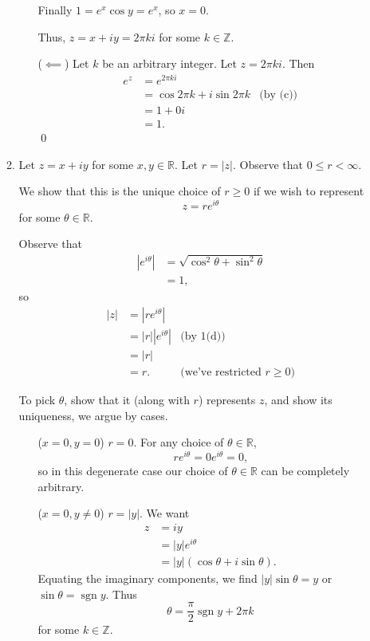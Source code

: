 \documentclass[oneside]{article}
\newcommand\abs[1]{\left|#1\right|}
\DeclareMathOperator{\sgn}{sgn}
\newcommand\bbR{\mathbb{R}}
\newcommand\bbZ{\mathbb{Z}}
\begin{document}
\begin{enumerate}[label=\textbf{\arabic*.}]
\begin{enumerate}[label=\textbf{(\alph*)}]
\begin{itemize}[leftmargin=34pt]
        Finally $1 = e^x \cos y = e^x$, so $x = 0$.

        Thus, $z = x + iy = 2\pi k i$ for some $k \in \bbZ$.

      \item[($\impliedby$)] Let $k$ be an arbitrary integer. Let $z = 2\pi k i$.
      Then\begin{align*}
        e^z &= e^{2\pi k i} \\
        &= \cos 2\pi k + i\sin 2\pi k &\text{(by (c))} \\
        &= 1 + 0i \\
        &= 1 \text{.}
      \end{align*}\qed
      \end{itemize}

    \item Let $z = x + iy$ for some $x, y \in \bbR$. Let $r = \abs{z}$.
      Observe that $0 \leq r < \infty$.

      We show that this is the unique choice of $r \geq 0$ if we wish to
      represent\[
        z = re^{i\theta}
      \] for some $\theta \in \bbR$.

      Observe that \begin{align*}
        \abs{e^{i\theta}}
        &= \sqrt{\cos^2\theta + \sin^2\theta} \\
        &= 1\text{,}
      \end{align*} so\begin{align*}
        \abs{z} &= \abs{re^{i\theta}} \\
        &= \abs{r}\abs{e^{i\theta}} &\text{(by 1(d))} \\
        &= \abs{r} \\
        &= r\text{.} &\text{(we've restricted $r \geq 0$)}
      \end{align*}

      To pick $\theta$, show that it (along with $r$) represents $z$, and show
      its uniqueness, we argue by cases.\begin{itemize}[leftmargin=64pt]
        \item[($x = 0, y = 0$)] $r = 0$. For any choice of
        $\theta \in \bbR$, \[
          re^{i\theta} = 0e^{i\theta} = 0 \text{,}
        \] so in this degenerate case our choice of $\theta \in \bbR$ can be
        completely arbitrary.

        \item[($x = 0, y \neq 0$)] $r = \abs{y}$. We want \begin{align*}
          z &= iy \\
          &= \abs{y}e^{i\theta} \\
          &= \abs{y}(\cos\theta + i\sin\theta) \text{.}
        \end{align*}
        Equating the imaginary components, we find
        $\abs{y}\sin\theta = y$ or $\sin\theta = \sgn y$.
        Thus \[
          \theta = \frac{\pi}{2}\sgn y + 2\pi k
        \] for some $k \in \bbZ$.


\end{itemize}
\end{enumerate}
\end{enumerate}
\end{document}
